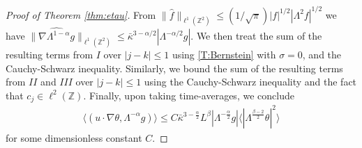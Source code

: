 \documentclass[twoside, reqno]{amsart}
\numberwithin{lemma}{section}
\numberwithin{theorem}{section}
\numberwithin{proposition}{section}
\numberwithin{equation}{section} %
\newcommand{\te}{\theta}
\newcommand{\la}{\Lambda}
\newcommand{\ka}{\kappa}
\newcommand{\ZZ}{\mathbb{Z}}
\begin{document}
\begin{proof}[Proof of Theorem \ref{thm:etau}]
From $\|\hat f\|_{\ell^1(\ZZ^2)} \le (1/\sqrt{\pi})|f|^{1/2}|\la^2 f|^{1/2}$ we have $\|\widehat{\nabla \la^{1-\alpha} g}\|_{\ell^1(\ZZ^2)} \le \bar{\ka}^{3-\alpha/2}|\la^{-\alpha/2}g|$. {We then treat the sum of the resulting terms from $I$ over $|j-k|\leq1$} using \eqref{T:Bernstein} with $\sigma=0$, {and the Cauchy-Schwarz inequality}. {Similarly, we bound the sum of the resulting terms from $II$ and $III$ over $|j-k|\leq1$ using the Cauchy-Schwarz inequality and the fact that $c_j\in\ell^2(\ZZ)$. Finally, upon taking time-averages}, we conclude 
\begin{align} \label{ineq:bterm}
 \langle (u\cdotp\nabla \te, \la^{-\alpha}g) \rangle \le  C \bar{\ka}^{3-\frac{\alpha}{2}}{L^{\beta}} |\la^{-\frac{\alpha}{2}}g| \langle |\la^{\frac{\beta-2}{2}}\te|^2 \rangle 
\end{align}
for {some} dimensionless constant $C$.


\end{proof}
\end{document}
